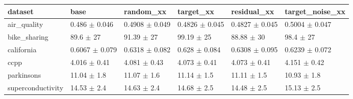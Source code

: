 \begin{tabular}{llllll}
\toprule
dataset & base & random\_xx & target\_xx & residual\_xx & target\_noise\_xx \\
\midrule
air\_quality & 0.486 $\pm$ 0.046 & 0.4908 $\pm$ 0.049 & 0.4826 $\pm$ 0.045 & 0.4827 $\pm$ 0.045 & 0.5004 $\pm$ 0.047 \\
bike\_sharing & 89.6 $\pm$ 27 & 91.39 $\pm$ 27 & 99.19 $\pm$ 25 & 88.88 $\pm$ 30 & 98.4 $\pm$ 27 \\
california & 0.6067 $\pm$ 0.079 & 0.6318 $\pm$ 0.082 & 0.628 $\pm$ 0.084 & 0.6308 $\pm$ 0.095 & 0.6239 $\pm$ 0.072 \\
ccpp & 4.016 $\pm$ 0.41 & 4.081 $\pm$ 0.43 & 4.073 $\pm$ 0.41 & 4.073 $\pm$ 0.41 & 4.151 $\pm$ 0.42 \\
parkinsons & 11.04 $\pm$ 1.8 & 11.07 $\pm$ 1.6 & 11.14 $\pm$ 1.5 & 11.11 $\pm$ 1.5 & 10.93 $\pm$ 1.8 \\
superconductivity & 14.53 $\pm$ 2.4 & 14.63 $\pm$ 2.4 & 14.68 $\pm$ 2.5 & 14.48 $\pm$ 2.5 & 15.13 $\pm$ 2.5 \\
\bottomrule
\end{tabular}
